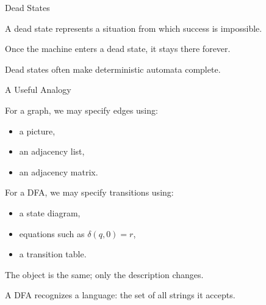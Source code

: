 \documentclass[10pt,aspectratio=169]{beamer}
\begin{document}
\begin{frame}{Dead States}

A dead state represents a situation from which success is impossible.

\pause

Once the machine enters a dead state, it stays there forever.

\begin{center}
\end{center}

\pause

Dead states often make deterministic automata complete.

\end{frame}

\begin{frame}{A Useful Analogy}

For a graph, we may specify edges using:

\begin{itemize}
\item a picture,
\item an adjacency list,
\item an adjacency matrix.
\end{itemize}

\pause

For a DFA, we may specify transitions using:

\begin{itemize}
\item a state diagram,
\item equations such as $\delta(q,0)=r$,
\item a transition table.
\end{itemize}

\pause

The object is the same; only the description changes.

\end{frame}

\begin{frame}[standout]
A DFA recognizes a language: the set of all strings it accepts.
\end{frame}
\end{document}
